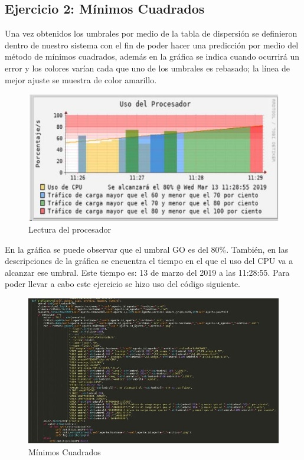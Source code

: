 \subsection{Ejercicio 2: Mínimos Cuadrados}
\noindent
Una vez obtenidos los umbrales por medio de la tabla de dispersión se definieron dentro de nuestro sistema con el fin de poder hacer una predicción por medio del método de mínimos cuadrados, además en la gráfica se indica cuando ocurrirá un error y los colores varían cada que uno de los umbrales es rebasado; la línea de mejor ajuste se muestra de color amarillo.
\begin{figure}[H]
  \centering
    \includegraphics[scale=1.5]{imagenes/primero/2.JPG}
    \caption{Lectura del procesador}
\end{figure}
\noindent
En la gráfica se puede observar que el umbral GO es del 80\%. También, en las descripciones de la gráfica se encuentra el tiempo en el que el uso del CPU va a alcanzar ese umbral. Este tiempo es: 13 de marzo del 2019 a las 11:28:55. Para poder llevar a cabo este ejercicio se hizo uso del código siguiente.
\begin{figure}[H]
  \centering
    \includegraphics[scale=1]{imagenes/primero/3.JPG}
    \caption{Mínimos Cuadrados}
\end{figure}
